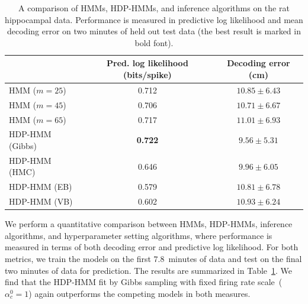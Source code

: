\begin{table}
\centering
\caption{A comparison of HMMs, HDP-HMMs, and inference algorithms on the rat hippocampal data. Performance is measured in predictive log likelihood and mean decoding error on two minutes of held out test data (the best result is marked in bold font).} 
\begin{tabular}{l|cc}
& Pred. log likelihood (bits/spike) & Decoding error (cm) \\
\hline 
  HMM ($m=25$)         & 0.712 & $10.85 \pm 6.43$ \\
  HMM ($m=45$)         & 0.706 & $10.71 \pm 6.67$\\
  HMM ($m=65$)         & 0.717 & $11.01 \pm 6.93$\\
  HDP-HMM (Gibbs)    & \bf{0.722} & $\mathbf{9.56 \pm 5.31}$ \\
  HDP-HMM (HMC)      & 0.646 & $9.96 \pm 6.05$\\
  HDP-HMM (EB)       & 0.579 & $10.81 \pm 6.78$\\
  HDP-HMM (VB)       & 0.602 & $10.93 \pm 6.24$\\

 \hline
\end{tabular}
\label{tab:hipp_err}
\end{table}

We perform a quantitative comparison between HMMs, HDP-HMMs, inference algorithms, and hyperparameter setting algorithms, where performance is measured in terms of both decoding error and predictive log likelihood. For both metrics, we train the models on the first $7.8$~minutes of data and test on the final two minutes of data for prediction. The results are summarized in Table~\ref{tab:hipp_err}. We find that the HDP-HMM fit by Gibbs sampling with fixed firing rate scale~($\alpha_c^0=1$) again outperforms the competing models in both measures.

